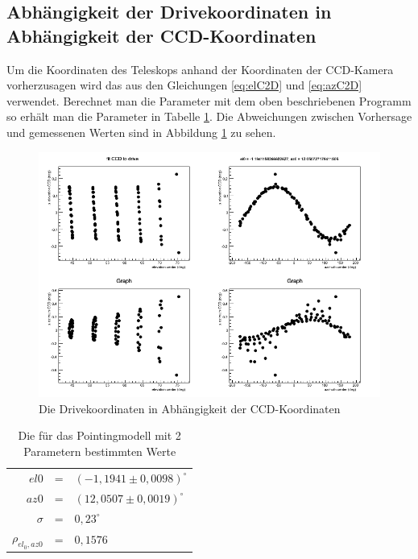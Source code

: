 \subsection{Abhängigkeit der Drivekoordinaten in Abhängigkeit der CCD-Koordinaten}
Um die Koordinaten des Teleskops anhand der Koordinaten der CCD-Kamera vorherzusagen wird das aus den Gleichungen \ref{eq:elC2D} und \ref{eq:azC2D} verwendet. Berechnet man die Parameter mit dem oben beschriebenen Programm so erhält man die Parameter in Tabelle \ref{tab:C2D}. Die Abweichungen zwischen Vorhersage und gemessenen Werten sind in Abbildung \ref{img:C2D} zu sehen.
\begin{figure}[htbp]
\centering
\includegraphics[width=\textwidth]{../341/run341C2D.png}
\caption{Die Drivekoordinaten in Abhängigkeit der CCD-Koordinaten}
\label{img:C2D}
\end{figure}
\begin{table}[htbp]
\centering
\begin{tabular}{rcl}
\toprule
$el0$ &=& $(-1,1941\pm0,0098)^{\circ}$\\
$az0$ &=& $(12,0507\pm0,0019)^{\circ}$\\
$\sigma$ &=& $0,23^{\circ}$\\
$\rho_{el_0,az0}$ &=& $0,1576$\\
\bottomrule
\end{tabular}
\label{tab:C2D}
\caption{Die für das Pointingmodell mit 2 Parametern bestimmten Werte}
\end{table}

